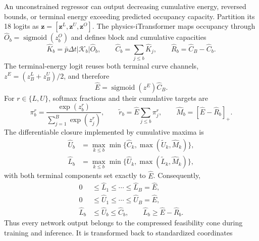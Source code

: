 \documentclass[11pt]{article}
\newcommand{\pos}[1]{\left[#1\right]_{+}}
\begin{document}
An unconstrained regressor can output decreasing cumulative energy, reversed
bounds, or terminal energy exceeding predicted occupancy capacity.  Partition
its 18 logits as
\(\mathbf z=[\mathbf z^L,\mathbf z^U,\mathbf z^O]\).
The physics-iTransformer maps occupancy through
\(\widehat O_b=\operatorname{sigmoid}(z^O_b)\) and defines block and cumulative
capacities
\begin{equation}
 \widehat K_b=\bar p\Delta t|\mathcal K_b|\widehat O_b,
 \qquad
 \widehat C_b=\sum_{j\le b}\widehat K_j,\qquad
 \widehat R_b=\widehat C_B-\widehat C_b.                \label{eq:physicalcapacity}
\end{equation}
The terminal-energy logit reuses both terminal curve channels,
\(z^E=(z_B^L+z_B^U)/2\), and therefore
\begin{equation}
 \widehat E=
 \operatorname{sigmoid}(z^E)\widehat C_B.              \label{eq:physicalenergy}
\end{equation}
For \(r\in\{L,U\}\), softmax fractions and their cumulative targets are
\begin{equation}
 \pi_b^r=\frac{\exp(z_b^r)}{\sum_{j=1}^B\exp(z_j^r)},
 \qquad
 \widetilde r_b=\widehat E\sum_{j\le b}\pi_j^r,\qquad
 \widehat M_b=\pos{\widehat E-\widehat R_b}.            \label{eq:physicalincrements}
\end{equation}
The differentiable closure implemented by cumulative maxima is
\begin{align}
 \widehat U_b
 &=\max_{k\le b}
 \min\{\widehat C_k,\max(\widetilde U_k,\widehat M_k)\},
                                                               \label{eq:physicaluppermap}\\
 \widehat L_b
 &=\max_{k\le b}
 \min\{\widehat U_k,\max(\widetilde L_k,\widehat M_k)\},
                                                               \label{eq:physicallowermap}
\end{align}
with both terminal components set exactly to \(\widehat E\).  Consequently,
\begin{align}
 0&\le\widehat L_1\le\cdots\le\widehat L_B=\widehat E, \nonumber\\
 0&\le\widehat U_1\le\cdots\le\widehat U_B=\widehat E, \nonumber\\
 \widehat L_b&\le\widehat U_b
 \le\widehat C_b,\qquad
 \widehat L_b\ge
 \widehat E-\widehat R_b.                              \label{eq:physicalcone}
\end{align}
Thus every network output belongs to the compressed feasibility cone during
training and inference.  It is transformed back to standardized coordinates
\end{document}
